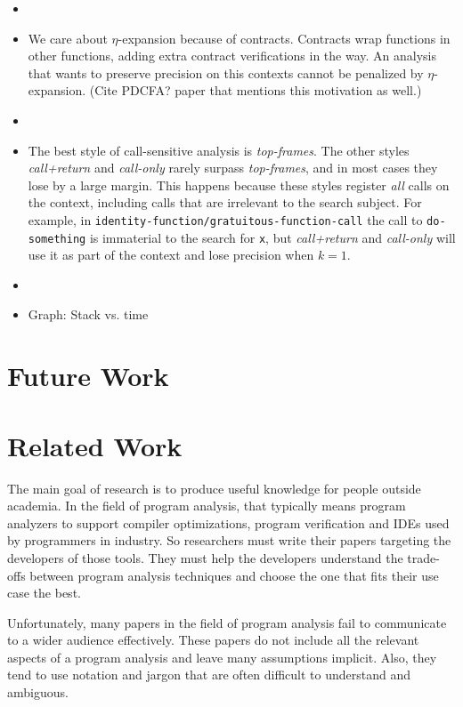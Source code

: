 \documentclass[12pt, oneside]{book}
\begin{document}
\begin{itemize}
  \item 
  
  \item We care about \(η\)-expansion because of contracts. Contracts wrap functions in other functions, adding extra contract verifications in the way. An analysis that wants to preserve precision on this contexts cannot be penalized by \(η\)-expansion. (Cite PDCFA? paper that mentions this motivation as well.)
  
  \item 
  
  \item The best style of call-sensitive analysis is \emph{top-frames}. The other styles \emph{call+return} and \emph{call-only} rarely surpass \emph{top-frames}, and in most cases they lose by a large margin. This happens because these styles register \emph{all} calls on the context, including calls that are irrelevant to the search subject. For example, in \texttt{identity-function/gratuitous-function-call} the call to \texttt{do-something} is immaterial to the search for \texttt{x}, but \emph{call+return} and \emph{call-only} will use it as part of the context and lose precision when \(k = 1\).
  
  \item 
  
  \item Graph: Stack vs. time  
\end{itemize}

\chapter{Future Work}
\label{section:future-work}

\chapter{Related Work}
\label{section:related-work}

The main goal of research is to produce useful knowledge for people outside academia. In the field of program analysis, that typically means program analyzers to support compiler optimizations, program verification and IDEs used by programmers in industry. So researchers must write their papers targeting the developers of those tools. They must help the developers understand the trade-offs between program analysis techniques and choose the one that fits their use case the best.

Unfortunately, many papers in the field of program analysis fail to communicate to a wider audience effectively. These papers do not include all the relevant aspects of a program analysis and leave many assumptions implicit. Also, they tend to use notation and jargon that are often difficult to understand and ambiguous.
\end{document}
